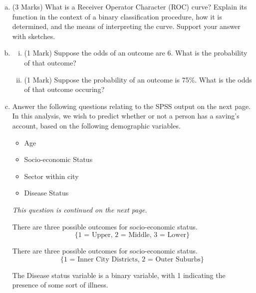 \documentclass[a4paper,12pt]{article}
\begin{document}
\begin{enumerate}
\begin{enumerate}[(a)]
			
\medskip
		\item (3 Marks) What is a Receiver Operator Character (ROC) curve? Explain its function in the context of a binary classification procedure, how it is determined, and the means of interpreting the curve. Support your answer with sketches.	
	
\medskip 

\item 
\begin{enumerate}[(i)]
\item (1 Mark) Suppose the odds of an outcome are 6. What is the probability of that outcome?
\item (1 Mark) Suppose the probability of an outcome is 75\%. What is the odds of that outcome occuring?
\end{enumerate}
\medskip

\item Answer the following questions relating to the SPSS output on the next page. In this analysis, we wish to predict whether or not a person has a saving's account, based on the following demographic variables.

\begin{itemize}
	\item Age
	\item Socio-economic Status
	\item Sector within city
	\item Disease Status
\end{itemize}
\noindent \textit{This question is continued on the next page.}


There are three possible outcomes for socio-economic status.
\[\{\mbox{1 = Upper, 2 = Middle, 3 = Lower}\}\]

There are three possible outcomes for socio-economic status.
\[\{\mbox{1 = Inner City Districts, 2 = Outer Suburbs}\}\]

The Disease status variable is a binary variable, with 1 indicating the presence of some sort of illness.







\end{enumerate}
\end{enumerate}
\end{document}
